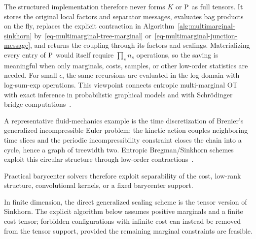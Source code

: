The structured implementation therefore never forms $K$ or $\P$ as full tensors. It stores the original local factors and separator messages, evaluates bag products on the fly, replaces the explicit contraction in Algorithm~\ref{alg:multimarginal-sinkhorn} by~\eqref{eq-multimarginal-tree-marginal} or~\eqref{eq-multimarginal-junction-message}, and returns the coupling through its factors and scalings. Materializing every entry of $\P$ would itself require $\prod_s n_s$ operations, so the saving is meaningful when only marginals, costs, samples, or other low-order statistics are needed. For small $\epsilon$, the same recursions are evaluated in the log domain with log-sum-exp operations. This viewpoint connects entropic multi-marginal OT with exact inference in probabilistic graphical models and with Schr\"odinger bridge computations~\cite{HaaslerRinghChenKarlsson2021TreeMOT,HaaslerSinghZhangKarlssonChen2020PGMMOT,FanHaaslerKarlssonChen2021GraphCostMOT,AltschulerBoixAdsera2022StructuredMOT}.

A representative fluid-mechanics example is the time discretization of Brenier's generalized incompressible Euler problem: the kinetic action couples neighboring time slices and the periodic incompressibility constraint closes the chain into a cycle, hence a graph of treewidth two. Entropic Bregman/Sinkhorn schemes exploit this circular structure through low-order contractions~\cite{2015-benamou-cisc,BenamouCarlierNenna2018GeneralizedIncompressible}.

Practical barycenter solvers therefore exploit separability of the cost, low-rank structure, convolutional kernels, or a fixed barycenter support.

In finite dimension, the direct generalized scaling scheme is the tensor version of Sinkhorn. The explicit algorithm below assumes positive marginals and a finite cost tensor; forbidden configurations with infinite cost can instead be removed from the tensor support, provided the remaining marginal constraints are feasible.

